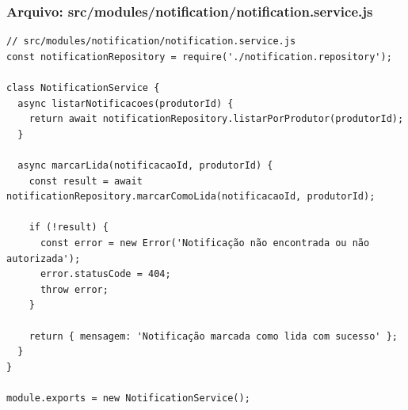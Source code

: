 \subsubsection*{Arquivo: src/modules/notification/notification.service.js}
\begin{lstlisting}[caption={src/modules/notification/notification.service.js}]
// src/modules/notification/notification.service.js
const notificationRepository = require('./notification.repository');

class NotificationService {
  async listarNotificacoes(produtorId) {
    return await notificationRepository.listarPorProdutor(produtorId);
  }

  async marcarLida(notificacaoId, produtorId) {
    const result = await notificationRepository.marcarComoLida(notificacaoId, produtorId);
    
    if (!result) {
      const error = new Error('Notificação não encontrada ou não autorizada');
      error.statusCode = 404;
      throw error;
    }
    
    return { mensagem: 'Notificação marcada como lida com sucesso' };
  }
}

module.exports = new NotificationService();\end{lstlisting}
\vspace{0.5cm}
